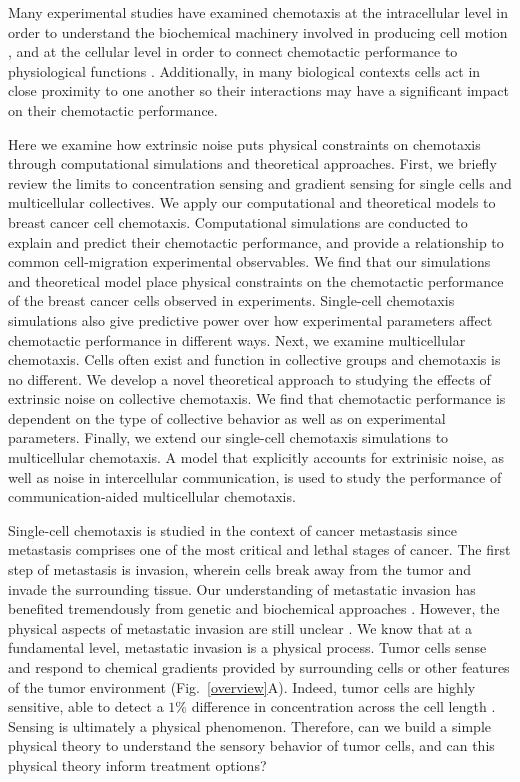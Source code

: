 Many experimental studies have examined chemotaxis at the intracellular level in order to understand the biochemical machinery involved in producing cell motion \cite{petrie2009random}, and at the cellular level in order to connect chemotactic performance to physiological functions \red{[CITE]}. Additionally, in many biological contexts cells act in close proximity to one another so their interactions may have a significant impact on their chemotactic performance.

Here we examine how extrinsic noise puts physical constraints on chemotaxis through computational simulations and theoretical approaches. First, we briefly review the limits to concentration sensing and gradient sensing for single cells and multicellular collectives. We apply our computational and theoretical models to breast cancer cell chemotaxis. Computational simulations are conducted to explain and predict their chemotactic performance, and provide a relationship to common cell-migration experimental observables. We find that our simulations and theoretical model place physical constraints on the chemotactic performance of the breast cancer cells observed in experiments. Single-cell chemotaxis simulations also give predictive power over how experimental parameters affect chemotactic performance in different ways. Next, we examine multicellular chemotaxis. Cells often exist and function in collective groups and chemotaxis is no different. We develop a novel theoretical approach to studying the effects of extrinsic noise on collective chemotaxis. We find that chemotactic performance is dependent on the type of collective behavior as well as on experimental parameters. Finally, we extend our single-cell chemotaxis simulations to multicellular chemotaxis. A model that explicitly accounts for extrinisic noise, as well as noise in intercellular communication, is used to study the performance of communication-aided multicellular chemotaxis.

Single-cell chemotaxis is studied in the context of cancer metastasis since metastasis comprises one of the most critical and lethal stages of cancer. The first step of metastasis is invasion, wherein cells break away from the tumor and invade the surrounding tissue. Our understanding of metastatic invasion has benefited tremendously from genetic and biochemical approaches \cite{leber2009molecular, hanahan2000hallmarks, hanahan2011hallmarks}. However, the physical aspects of metastatic invasion are still unclear \cite{hanahan2011hallmarks}. We know that at a fundamental level, metastatic invasion is a physical process. Tumor cells sense and respond to chemical gradients provided by surrounding cells
\cite{abhowmick2004stromal, condeelis2006macrophages, shields2007autologous, puliafito2015three} or other features of the tumor environment
\cite{shields2007autologous, polacheck2011interstitial, shieh2011regulation} (Fig.\ \ref{overview}A). Indeed, tumor cells are highly sensitive, able to detect a $1\%$ difference in concentration across the cell length
\cite{shields2007autologous}. Sensing is ultimately a physical phenomenon. Therefore, can we build a simple physical theory to understand the sensory behavior of tumor cells, and can this physical theory inform treatment options?


